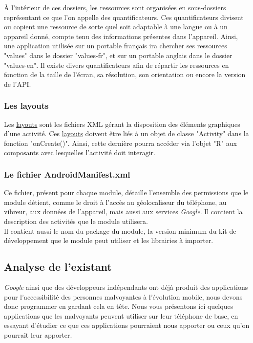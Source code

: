 \`{A} l'intérieur de ces dossiers, les ressources sont organisées en sous-dossiers représentant ce que l'on appelle des quantificateurs. Ces quantificateurs divisent ou copient une ressource de sorte quel soit adaptable à une langue ou à un appareil donné, compte tenu des informations présentes dans l'appareil. Ainsi, une application utilisée sur un portable français ira chercher ses ressources "values" dans le dossier "values-fr", et sur un portable anglais dans le dossier "values-en". Il existe divers quantificateurs afin de répartir les ressources en fonction de la taille de l'écran, sa résolution, son orientation ou encore la version de l'API.

\subsubsection{Les layouts}Les \underline{layouts} sont les fichiers XML gérant la disposition des éléments graphiques d'une activité. Ces \underline{layouts} doivent être liés à un objet de classe "Activity" dans la fonction "onCreate()". Ainsi, cette dernière pourra accéder via l'objet "R" aux composants avec lesquelles l'activité doit interagir.

\subsubsection{Le fichier AndroidManifest.xml} Ce fichier, présent pour chaque module, détaille l'ensemble des permissions que le module détient, comme le droit à l'accès au géolocaliseur du téléphone, au vibreur, aux données de l'appareil, mais aussi aux services \textit{Google}. Il contient la description des activités que le module utilisera.\\
Il contient aussi le nom du package du module, la version minimum du kit de développement que le module peut utiliser et les librairies à importer.

\subsection{Analyse de l'existant}

\textit{Google} ainsi que des développeurs indépendants ont déjà produit des applications pour l'accessibilité des personnes malvoyantes à l'évolution mobile, nous devons donc programmer en gardant cela en tête. Nous vous présentons ici quelques applications que les malvoyants peuvent utiliser sur leur téléphone de base, en essayant d'étudier ce que ces applications pourraient nous apporter ou ceux qu'on pourrait leur apporter.

